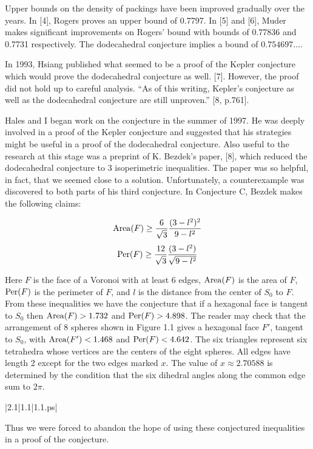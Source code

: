 Upper bounds on the density of packings have been improved gradually
over the years.  In [4], Rogers proves an upper bound of 0.7797.  In [5] and [6], 
Muder makes significant improvements on Rogers' bound with bounds of 
0.77836 and 0.7731 respectively.  The dodecahedral conjecture 
implies a bound of $0.754697\dots$.


In 1993, Hsiang published what seemed to be a proof of the Kepler conjecture which would prove the 
dodecahedral conjecture as well. [7].  However, the proof did not hold up to
 careful analysis.  ``As of this writing, Kepler's conjecture as well as the 
dodecahedral conjecture are still unproven.'' [8, p.761].

Hales and I began work on the conjecture in the summer of 1997.  He was deeply 
involved in a proof of the Kepler conjecture and suggested that his strategies 
might be useful in a proof of the dodecahedral conjecture.  Also useful to the 
research at this stage was a preprint of K. Bezdek's paper, [8], which reduced 
the dodecahedral conjecture to 3 isoperimetric inequalities.  The paper was so helpful,
 in fact, that we seemed close to a solution.  Unfortunately, a counterexample 
was discovered to both parts of his third conjecture.  In Conjecture C, 
Bezdek makes the following claims:


$$\operatorname{Area}(F)\ge \frac 6 {\sqrt3} \frac {(3-l^2)^2}{9-l^2}$$
$$\operatorname{Per}(F)\ge\frac {12} {\sqrt3} \frac {(3-l^2)}{\sqrt{9-l^2}}$$

Here $F$ is the face of a Voronoi with at least 6 edges, $\operatorname{Area}(F)$ 
is the area of $F$, $\operatorname{Per}(F)$ is the perimeter of $F$, and $l$ is the distance 
from the center of $S_0$ to $F$.  From these inequalities we have the conjecture
 that if a hexagonal face is tangent to $S_0$ then $\operatorname{Area}(F) > 1.732$ and 
$\operatorname{Per}(F)>4.898$.  The reader may check that the arrangement of 8 spheres shown 
in Figure 1.1 gives a hexagonal face $F'$, tangent to $S_0$, with $\operatorname{Area}(F')<1.468$
 and $\operatorname{Per}(F)<4.642$.  
The six triangles represent six tetrahedra whose vertices
are the centers of the eight spheres.  
All edges have length 2 except for the two edges marked $x$.  
The value of $x\approx 2.70588$ 
is determined by the condition that the six dihedral
angles along the common edge sum to $2\pi$.
	
\gram|2.1|1.1|1.1.ps|  %


Thus we were forced to abandon the hope of using these conjectured inequalities 
in a proof of the conjecture.
	
